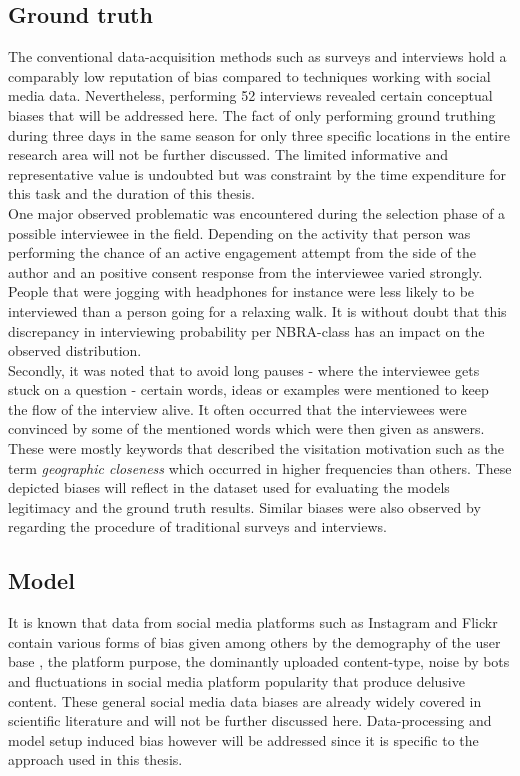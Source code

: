 \subsection*{Ground truth}
The conventional data-acquisition methods such as surveys and interviews hold a comparably low reputation of bias compared to techniques working with social media data. Nevertheless, performing 52 interviews revealed certain conceptual biases that will be addressed here. The fact of only performing ground truthing during three days in the same season for only three specific locations in the entire research area will not be further discussed. The limited informative and representative value is undoubted but was constraint by the time expenditure for this task and the duration of this thesis. \\
One major observed problematic was encountered during the selection phase of a possible interviewee in the field. Depending on the activity that person was performing the chance of an active engagement attempt from the side of the author and an positive consent response from the interviewee varied strongly. People that were jogging with headphones for instance were less likely to be interviewed than a person going for a relaxing walk. It is without doubt that this discrepancy in interviewing probability per NBRA-class has an impact on the observed distribution.\\
Secondly, it was noted that to avoid long pauses - where the interviewee gets stuck on a question - certain words, ideas or examples were mentioned to keep the flow of the interview alive. It often occurred that the interviewees were convinced by some of the mentioned words which were then given as answers. These were mostly keywords that described the visitation motivation such as the term \textit{geographic closeness} which occurred in higher frequencies than others. These depicted biases will reflect in the dataset used for evaluating the models legitimacy and the ground truth results. Similar biases were also observed by \textcite{Hanemann2011, Kling2012, Tenerelli2016} regarding the procedure of traditional surveys and interviews.

\subsection*{Model}
It is known that data from social media platforms such as Instagram and Flickr contain various forms of bias given among others by the demography of the user base \parencite{Heikinheimo2017}, the platform purpose, the dominantly uploaded content-type, noise by bots \parencite{Edwards2014} and fluctuations in social media platform popularity that produce delusive content. These general social media data biases are already widely covered in scientific literature \parencite{Ruths2014, Lazer2014, Zook2017} and will not be further discussed here. Data-processing and model setup induced bias however will be addressed since it is specific to the approach used in this thesis. \\


